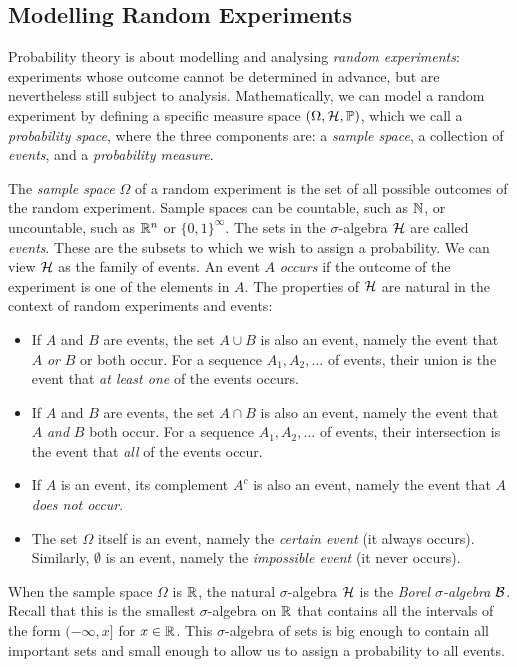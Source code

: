 \subsection{Modelling Random Experiments}

Probability theory is about modelling and analysing \textit{random experiments}: experiments whose outcome cannot be determined in advance, but are nevertheless still subject to analysis. Mathematically, we can model a random experiment by defining a specific measure space \((\Omega, \mathcal{H}, \mathbb{P})\), which we call a \textit{probability space}, where the three components are: a \textit{sample space}, a collection of \textit{events}, and a \textit{probability measure}.

The \textit{sample space} \(\Omega\) of a random experiment is the set of all possible outcomes of the random experiment. Sample spaces can be countable, such as \(\mathbb{N}\), or uncountable, such as \(\mathbb{R}^n\) or \(\{0, 1\}^\infty\). The sets in the \(\sigma\)-algebra \(\mathcal{H}\) are called \textit{events}. These are the subsets to which we wish to assign a probability. We can view \(\mathcal{H}\) as the family of events. An event \(A\) \textit{occurs} if the outcome of the experiment is one of the elements in \(A\). The properties of \(\mathcal{H}\) are natural in the context of random experiments and events:

\begin{itemize}
	\item If \(A\) and \(B\) are events, the set \(A \cup B\) is also an event, namely the event that \(A\) \textit{or} \(B\) or both occur. For a sequence \(A_1, A_2, \dots\) of events, their union is the event that \textit{at least one} of the events occurs.
	\item If \(A\) and \(B\) are events, the set \(A \cap B\) is also an event, namely the event that \(A\) \textit{and} \(B\) both occur. For a sequence \(A_1, A_2, \dots\) of events, their intersection is the event that \textit{all} of the events occur.
	\item If \(A\) is an event, its complement \(A^c\) is also an event, namely the event that \(A\) \textit{does not occur}.
	\item The set \(\Omega\) itself is an event, namely the \textit{certain event} (it always occurs). Similarly, \(\emptyset\) is an event, namely the \textit{impossible event} (it never occurs).
\end{itemize}

When the sample space \(\Omega\) is \(\mathbb{R}\), the natural \(\sigma\)-algebra \(\mathcal{H}\) is the \textit{Borel \(\sigma\)-algebra} \(\mathcal{B}\). Recall that this is the smallest \(\sigma\)-algebra on \(\mathbb{R}\) that contains all the intervals of the form \((-\infty, x]\) for \(x \in \mathbb{R}\). This \(\sigma\)-algebra of sets is big enough to contain all important sets and small enough to allow us to assign a probability to all events.

